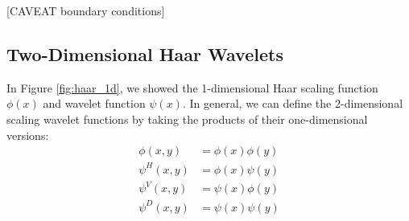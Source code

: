 [CAVEAT boundary conditions]

\subsection{Two-Dimensional Haar Wavelets}
In Figure \ref{fig:haar_1d}, we showed the 1-dimensional Haar scaling function $\phi(x)$ and wavelet function $\psi(x)$.
In general, we can define the 2-dimensional scaling wavelet functions by taking the products of their one-dimensional versions:
\begin{equation}
  \begin{split}
    \phi(x,y) &= \phi(x) \phi(y)\\
    \psi^H(x,y) &= \phi(x) \psi(y) \\
    \psi^V(x,y) &= \psi(x) \phi(y) \\
    \psi^D(x,y) &= \psi(x) \psi(y)
  \end{split}
\end{equation}

